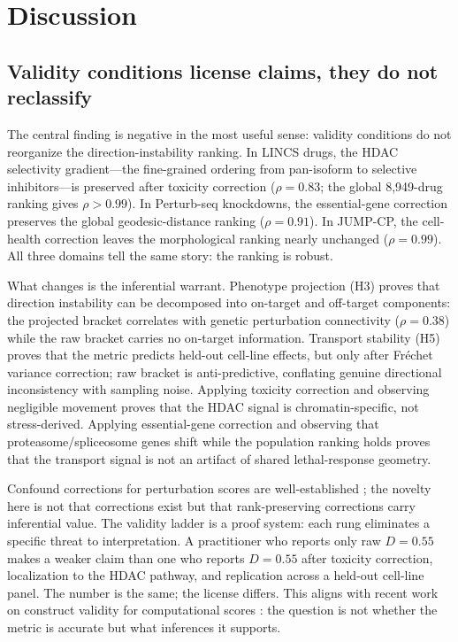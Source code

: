 \documentclass{article}
\begin{document}
\section{Discussion}

\subsection{Validity conditions license claims, they do not reclassify}

The central finding is negative in the most useful sense: validity conditions
do not reorganize the direction-instability ranking. In LINCS drugs, the
HDAC selectivity gradient---the fine-grained ordering from pan-isoform to
selective inhibitors---is preserved after toxicity correction ($\rho =
0.83$; the global 8{,}949-drug ranking gives $\rho > 0.99$). In Perturb-seq
knockdowns, the essential-gene correction preserves the global
geodesic-distance ranking ($\rho = 0.91$). In JUMP-CP, the cell-health
correction leaves the morphological ranking nearly unchanged ($\rho =
0.99$). All three domains tell the same story: the ranking is robust.

What changes is the inferential warrant. Phenotype projection (H3) proves
that direction instability can be decomposed into on-target and off-target
components: the projected bracket correlates with genetic perturbation
connectivity ($\rho = 0.38$) while the raw bracket carries no on-target
information. Transport stability (H5) proves that the metric predicts
held-out cell-line effects, but only after Fr\'{e}chet variance correction;
raw bracket is anti-predictive, conflating genuine directional inconsistency
with sampling noise. Applying toxicity correction and
observing negligible movement proves that the HDAC signal is
chromatin-specific, not stress-derived. Applying essential-gene correction
and observing that proteasome/spliceosome genes shift while the population
ranking holds proves that the transport signal is not an artifact of shared
lethal-response geometry.

Confound corrections for perturbation scores are well-established
\citep{meyers2017ceres,pacini2021integrated}; the novelty here is not that
corrections exist but that rank-preserving corrections carry inferential
value. The validity ladder is a proof system: each rung eliminates a specific
threat to interpretation. A practitioner who reports only raw $D = 0.55$
makes a weaker claim than one who reports $D = 0.55$ after toxicity
correction, localization to the HDAC pathway, and replication across a
held-out cell-line panel. The number is the same; the license differs.
This aligns with recent work on construct validity for computational
scores \citep{freiesleben2025benchmarking,watson2025measuring}: the
question is not whether the metric is accurate but what inferences it
supports.
\end{document}
